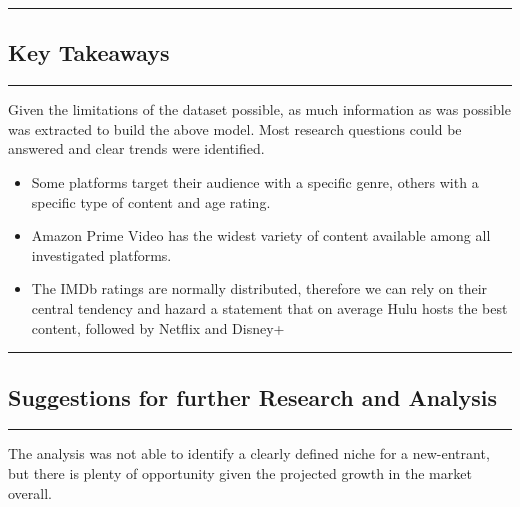 \documentclass[
]{article}
\providecommand{\tightlist}{%
  \setlength{\itemsep}{0pt}\setlength{\parskip}{0pt}}
\begin{document}
\begin{center}\rule{0.5\linewidth}{0.5pt}\end{center}

\hypertarget{key-takeaways}{%
\subsection{Key Takeaways}\label{key-takeaways}}

\begin{center}\rule{0.5\linewidth}{0.5pt}\end{center}

Given the limitations of the dataset possible, as much information as
was possible was extracted to build the above model. Most research
questions could be answered and clear trends were identified.

\begin{itemize}
\tightlist
\item
  Some platforms target their audience with a specific genre, others
  with a specific type of content and age rating.\\
\item
  Amazon Prime Video has the widest variety of content available among
  all investigated platforms.\\
\item
  The IMDb ratings are normally distributed, therefore we can rely on
  their central tendency and hazard a statement that on average Hulu
  hosts the best content, followed by Netflix and Disney+
\end{itemize}

\begin{center}\rule{0.5\linewidth}{0.5pt}\end{center}

\hypertarget{suggestions-for-further-research-and-analysis}{%
\subsection{Suggestions for further Research and
Analysis}\label{suggestions-for-further-research-and-analysis}}

\begin{center}\rule{0.5\linewidth}{0.5pt}\end{center}

The analysis was not able to identify a clearly defined niche for a
new-entrant, but there is plenty of opportunity given the projected
growth in the market overall.
\end{document}
